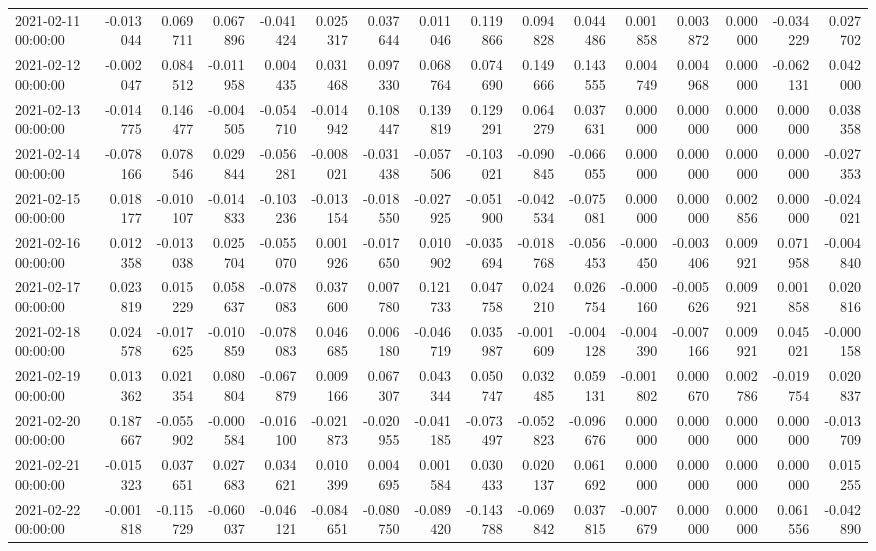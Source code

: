 \begin{tabular}{lrrrrrrrrrrrrrrr}
2021-02-11 00:00:00 & -0.013044 & 0.069711 & 0.067896 & -0.041424 & 0.025317 & 0.037644 & 0.011046 & 0.119866 & 0.094828 & 0.044486 & 0.001858 & 0.003872 & 0.000000 & -0.034229 & 0.027702 \\
2021-02-12 00:00:00 & -0.002047 & 0.084512 & -0.011958 & 0.004435 & 0.031468 & 0.097330 & 0.068764 & 0.074690 & 0.149666 & 0.143555 & 0.004749 & 0.004968 & 0.000000 & -0.062131 & 0.042000 \\
2021-02-13 00:00:00 & -0.014775 & 0.146477 & -0.004505 & -0.054710 & -0.014942 & 0.108447 & 0.139819 & 0.129291 & 0.064279 & 0.037631 & 0.000000 & 0.000000 & 0.000000 & 0.000000 & 0.038358 \\
2021-02-14 00:00:00 & -0.078166 & 0.078546 & 0.029844 & -0.056281 & -0.008021 & -0.031438 & -0.057506 & -0.103021 & -0.090845 & -0.066055 & 0.000000 & 0.000000 & 0.000000 & 0.000000 & -0.027353 \\
2021-02-15 00:00:00 & 0.018177 & -0.010107 & -0.014833 & -0.103236 & -0.013154 & -0.018550 & -0.027925 & -0.051900 & -0.042534 & -0.075081 & 0.000000 & 0.000000 & 0.002856 & 0.000000 & -0.024021 \\
2021-02-16 00:00:00 & 0.012358 & -0.013038 & 0.025704 & -0.055070 & 0.001926 & -0.017650 & 0.010902 & -0.035694 & -0.018768 & -0.056453 & -0.000450 & -0.003406 & 0.009921 & 0.071958 & -0.004840 \\
2021-02-17 00:00:00 & 0.023819 & 0.015229 & 0.058637 & -0.078083 & 0.037600 & 0.007780 & 0.121733 & 0.047758 & 0.024210 & 0.026754 & -0.000160 & -0.005626 & 0.009921 & 0.001858 & 0.020816 \\
2021-02-18 00:00:00 & 0.024578 & -0.017625 & -0.010859 & -0.078083 & 0.046685 & 0.006180 & -0.046719 & 0.035987 & -0.001609 & -0.004128 & -0.004390 & -0.007166 & 0.009921 & 0.045021 & -0.000158 \\
2021-02-19 00:00:00 & 0.013362 & 0.021354 & 0.080804 & -0.067879 & 0.009166 & 0.067307 & 0.043344 & 0.050747 & 0.032485 & 0.059131 & -0.001802 & 0.000670 & 0.002786 & -0.019754 & 0.020837 \\
2021-02-20 00:00:00 & 0.187667 & -0.055902 & -0.000584 & -0.016100 & -0.021873 & -0.020955 & -0.041185 & -0.073497 & -0.052823 & -0.096676 & 0.000000 & 0.000000 & 0.000000 & 0.000000 & -0.013709 \\
2021-02-21 00:00:00 & -0.015323 & 0.037651 & 0.027683 & 0.034621 & 0.010399 & 0.004695 & 0.001584 & 0.030433 & 0.020137 & 0.061692 & 0.000000 & 0.000000 & 0.000000 & 0.000000 & 0.015255 \\
2021-02-22 00:00:00 & -0.001818 & -0.115729 & -0.060037 & -0.046121 & -0.084651 & -0.080750 & -0.089420 & -0.143788 & -0.069842 & 0.037815 & -0.007679 & 0.000000 & 0.000000 & 0.061556 & -0.042890 \\

\end{tabular}
